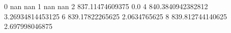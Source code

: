 0 nan nan
1 nan nan
2 837.11474609375 0.0
4 840.3840942382812 3.26934814453125
6 839.17822265625 2.0634765625
8 839.812744140625 2.697998046875
